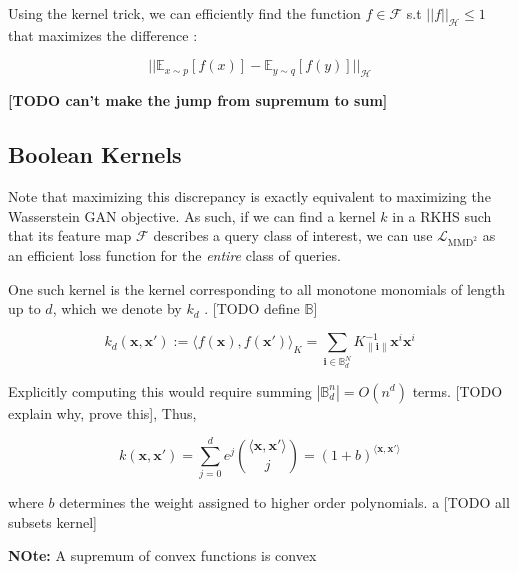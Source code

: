 \documentclass[
]{article}
\begin{document}
Using the kernel trick, we can efficiently find the function
$f \in \mathcal{F}$ s.t $||f||_\mathcal{H} \leq 1$ that maximizes the difference :

\[
  ||\mathbb{E}_{x\sim p}[f(x)] - \mathbb{E}_{y\sim q}[f(y)]||_\mathcal{H}
\]

\textbf{[TODO can't make the jump from supremum to sum]}



\subsection{Boolean Kernels}



Note that maximizing this discrepancy is exactly equivalent to
maximizing the Wasserstein GAN objective. As such, if we can find a
kernel \(k\) in a RKHS such that its feature map \(\mathcal{F}\)
describes a query class of interest, we can use
\(\mathcal{L}_{\mathrm{MMD}^2}\) as an efficient loss function for the
\emph{entire} class of queries.

One such kernel is the kernel corresponding to all monotone monomials of
length up to \(d\), which we denote by \(k_d\) \cite{PLA18}. {[}TODO
define \(\mathbb{B}\){]}

\[
  k_d (\mathbf{x}, \mathbf{x}'):= \langle f(\mathbf{x}), f (\mathbf{x}')\rangle_{K}=\sum_{\mathbf{i} \in \mathbb{B}^N_d} K_{\|\mathbf{i}\|}^{-1} \mathbf{x}^i \mathbf{x}^i
\]

Explicitly computing this would require summing
\(|\mathbb{B}_d^n| = O(n^d)\) terms. {[}TODO explain why, prove this{]},
Thus,

\[k (\mathbf{x}, \mathbf{x}') = \sum_{j=0}^d e^j \binom{\langle\mathbf{x}, \mathbf{x}'\rangle}{j}
=(1+b)^{ \langle \mathbf{x}, \mathbf{x}'\rangle}\]


where \(b\) determines the weight assigned to higher order polynomials.
a
{[}TODO all subsets kernel{]}

\textbf{NOte:} A supremum of convex functions is convex



\end{document}
